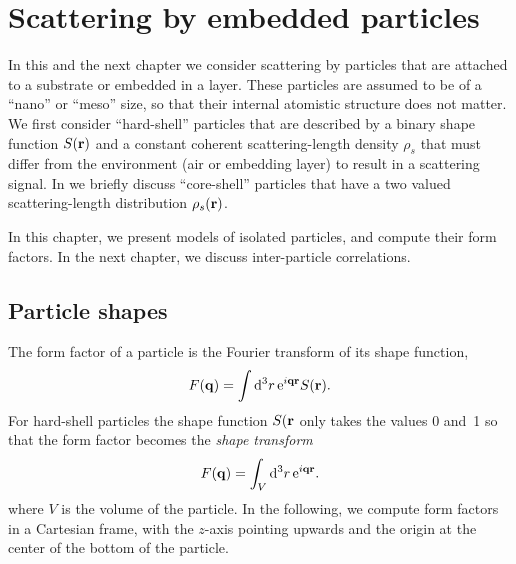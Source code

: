 

\chapter{Scattering by embedded particles}  


In this and the next chapter we consider scattering by particles
that are attached to a substrate or embedded in a layer.
These particles are assumed to be of a ``nano'' or ``meso'' size,
%
%
%
so that their internal atomistic structure does not matter.
We first consider ``hard-shell'' particles
that are described by a binary shape function $S(\mathbf{r})$
and a constant coherent scattering-length density $\rho_s$
that must differ from the environment (air or embedding layer)
to result in a scattering signal.
In  we briefly discuss ``core-shell'' particles
that have a two valued scattering-length distribution $\rho_s(\mathbf{r})$.

In this chapter,
we present models of isolated particles,
and compute their form factors.
In the next chapter, we discuss inter-particle correlations.

\section{Particle shapes}

The form factor of a particle is the Fourier transform
of its shape function,
\begin{equation}
  F(\mathbf{q})=\int {\rm d}^3r\, {\rm e}^{i\mathbf{q}\mathbf{r}} S(\mathbf{r}).
\end{equation}
For hard-shell particles the shape function $S(\mathbf{r}$ only takes
the values 0 and~1
so that the form factor becomes
the \textit{shape transform}
\begin{equation}\label{eq:FFHard}
  F(\mathbf{q})=\int_V {\rm d}^3r\, {\rm e}^{i\mathbf{q}\mathbf{r}}.
\end{equation}
where $V$ is the volume of the particle.
In the following,
we compute form factors in a Cartesian frame,
with the $z$-axis pointing upwards and
the origin at the center of the bottom of the particle.

